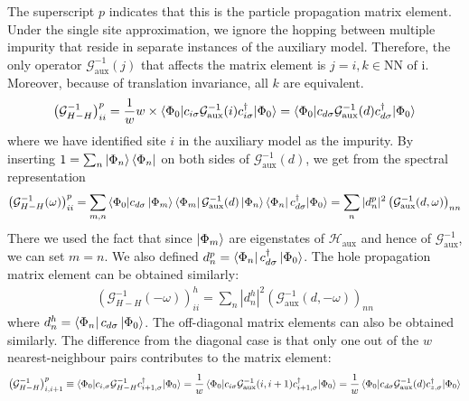 \documentclass[10pt]{report}
\numberwithin{equation}{section}
\begin{document}
The superscript \(p\) indicates that this is the particle propagation matrix element.
Under the single site approximation, we ignore the hopping between multiple impurity that reside in separate instances of the auxiliary model. Therefore, the only operator \(\mathcal{G}^{-1}_\text{aux}(j)\) that affects the matrix element is \(j=i, k \in \text{NN of i}\). Moreover, because of translation invariance, all \(k\) are equivalent.
\begin{equation}\begin{aligned}
	\left(\mathcal{G}^{-1}_{H-H}\right)^p_{ii} = \frac{1}{w} w\times \braket{\Phi_0 | c_{i\sigma} \mathcal{G}^{-1}_\text{aux}(i) c^\dagger_{i\sigma} | \Phi_0} = \braket{\Phi_0 | c_{d\sigma} \mathcal{G}^{-1}_\text{aux}(d) c^\dagger_{d\sigma} | \Phi_0}
\end{aligned}\end{equation}
where we have identified site \(i\) in the auxiliary model as the impurity.
By inserting \(1 = \sum_n \ket{\Phi_n}\bra{\Phi_n}\) on both sides of \(\mathcal{G}^{-1}_\text{aux}(d)\), we get from the spectral representation
\begin{equation}\begin{aligned}
	\left(\mathcal{G}^{-1}_{H-H}(\omega)\right)^p_{ii} = \sum_{m,n} \braket{\Phi_0 | c_{d\sigma} \ket{\Phi_m}\bra{\Phi_m}\mathcal{G}^{-1}_\text{aux}(d) \ket{\Phi_n}\bra{\Phi_n} c^\dagger_{d\sigma} | \Phi_0} = \sum_{n} |d^p_n|^2 \left(\mathcal{G}^{-1}_\text{aux}(d, \omega)\right)_{nn} 
\end{aligned}\end{equation}
There we used the fact that since \(\ket{\Phi_m}\) are eigenstates of \(\mathcal{H}_\text{aux}\) and hence of \(\mathcal{G}^{-1}_\text{aux}\), we can set \(m=n\). We also defined \(d^p_n = \bra{\Phi_n}c^\dagger_{d\sigma}\ket{\Phi_0}\). The hole propagation matrix element can be obtained similarly:
\begin{equation}\begin{aligned}
	\left(\mathcal{G}^{-1}_{H-H}(-\omega)\right)^h_{ii} = \sum_{n} |d^h_n|^2 \left(\mathcal{G}^{-1}_\text{aux}(d, -\omega)\right)_{nn} 
\end{aligned}\end{equation}
where \(d^h_n = \bra{\Phi_n}c_{d\sigma}\ket{\Phi_0}\). The off-diagonal matrix elements can also be obtained similarly. The difference from the diagonal case is that only one out of the \(w\) nearest-neighbour pairs contributes to the matrix element:
\begin{equation}\begin{aligned}
	\left(\mathcal{G}^{-1}_{H-H}\right)^p_{i,i+1} \equiv \braket{\Phi_0 | c_{i,\sigma} \mathcal{G}^{-1}_{H-H} c^\dagger_{i+1,\sigma} | \Phi_0} = \frac{1}{w}\braket{\Phi_0 | c_{i\sigma} \mathcal{G}^{-1}_\text{aux}(i,i+1) c^\dagger_{i+1,\sigma} | \Phi_0} = \frac{1}{w}\braket{\Phi_0 | c_{d\sigma} \mathcal{G}^{-1}_\text{aux}(d) c^\dagger_{z,\sigma} | \Phi_0}
\end{aligned}\end{equation}
\end{document}
